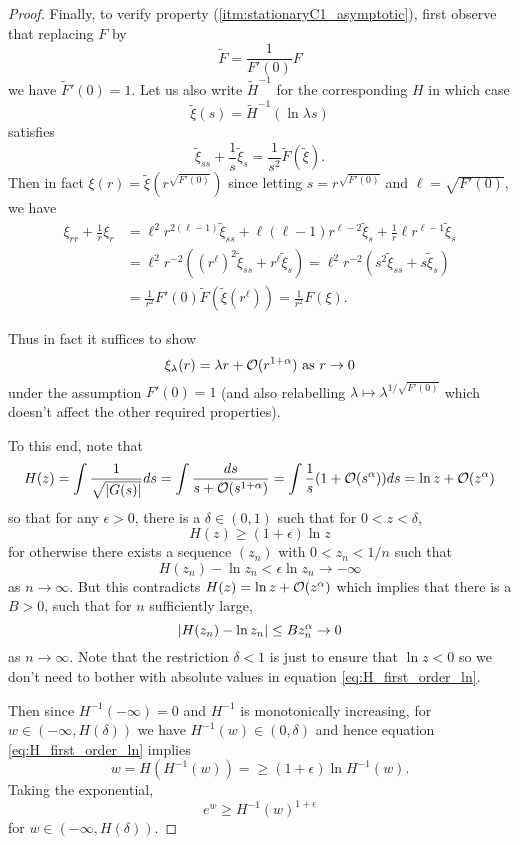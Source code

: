 \documentclass{amsart}
\begin{document}
\begin{proof}
Finally, to verify property (\ref{itm:stationaryC1_asymptotic}), first observe that replacing \(F\) by
\[
\tilde{F} = \frac{1}{F'(0)} F
\]
we have \(\tilde{F}'(0) = 1\). Let us also write \(\tilde{H}^{-1}\) for the corresponding \(H\) in which case
\[
\tilde{\xi}(s) = \tilde{H}^{-1} (\ln \lambda s)
\]
satisfies
\[
\tilde{\xi}_{ss} + \frac{1}{s} \tilde{\xi}_s = \frac{1}{s^2} \tilde{F}(\tilde{\xi}).
\]
Then in fact \(\xi(r) = \tilde{\xi}(r^{\sqrt{F'(0)}})\) since letting \(s = r^{\sqrt{F'(0)}}\) and \(\ell = \sqrt{F'(0)}\), we have
\[
\begin{split}
\xi_{rr} + \frac{1}{r} \xi_r &= \ell^2 r^{2(\ell - 1)} \tilde{\xi}_{ss} + \ell (\ell - 1) r^{\ell - 2} \tilde{\xi}_s + \frac{1}{r} \ell r^{\ell - 1} \tilde{\xi}_s \\
&= \ell^2 r^{-2} \left((r^{\ell})^2\tilde{\xi}_{ss} + r^{\ell} \tilde{\xi}_s\right) = \ell^2 r^{-2} \left(s^2 \tilde{\xi}_{ss} + s \tilde{\xi}_s\right) \\
&= \frac{1}{r^2} F'(0) \tilde{F}(\tilde{\xi}(r^{\ell})) = \frac{1}{r^2} F(\xi).
\end{split}
\]

Thus in fact it suffices to show
\[
\xi_{\lambda} (r) = \lambda r + \operatorname{\mathcal{O}}(r^{1 + \alpha}) \text{ as } r \to 0
\]
under the assumption \(F'(0) = 1\) (and also relabelling \(\lambda \mapsto \lambda^{1/\sqrt{F'(0)}}\) which doesn't affect the other required properties).

To this end, note that
\[
H(z) = \int \frac{1}{\sqrt{|G(s)|}} ds = \int \frac{ds}{s + \operatorname{\mathcal{O}}(s^{1+\alpha})} = \int \frac{1}{s}(1 + \operatorname{\mathcal{O}}(s^{\alpha})) ds = \ln z + \operatorname{\mathcal{O}}(z^{\alpha})
\]
so that for any \(\epsilon > 0\), there is a \(\delta \in (0, 1)\) such that for \(0 < z < \delta\),
\begin{equation}
\label{eq:H_first_order_ln}
H(z) \geq (1 + \epsilon) \ln z
\end{equation}
for otherwise there exists a sequence \((z_n)\) with \(0 < z_n < 1/n\) such that
\[
H(z_n) - \ln z_n < \epsilon \ln z_n \to -\infty
\]
as \(n \to \infty\). But this contradicts \(H(z) = \ln z + \operatorname{\mathcal{O}}(z^{\alpha})\) which implies that there is a \(B > 0\), such that for \(n\) sufficiently large,
\[
\left|{H(z_n) - \ln z_n}\right| \leq B z_n^{\alpha} \to 0
\]
as \(n \to \infty\). Note that the restriction \(\delta < 1\) is just to ensure that \(\ln z < 0\) so we don't need to bother with absolute values in equation \eqref{eq:H_first_order_ln}.

Then since \(H^{-1}(-\infty) = 0\) and \(H^{-1}\) is monotonically increasing, for \(w \in (-\infty, H(\delta))\) we have \(H^{-1}(w) \in (0, \delta)\) and hence equation \eqref{eq:H_first_order_ln} implies
\[
w = H(H^{-1} (w)) = \geq (1 + \epsilon) \ln H^{-1}(w).
\]
Taking the exponential,
\begin{equation}
\label{eq:Hinv_first_order_exp}
e^w \geq H^{-1}(w)^{1+\epsilon}
\end{equation}
for \(w \in (-\infty, H(\delta))\).


\end{proof}
\end{document}
